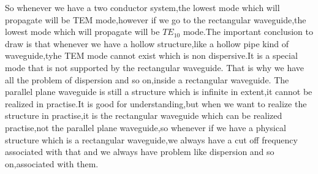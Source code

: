 So whenever we have a two conductor system,the lowest mode which will propagate will be TEM mode,however if we go to the rectangular waveguide,the lowest mode which will propagate will be ${TE_{10}}$ mode.The important conclusion to draw is that whenever we have a hollow structure,like a hollow pipe kind of waveguide,tyhe TEM mode cannot exist which is non dispersive.It is a special mode that is not supported by the rectangular waveguide. That is why we have all the problem of dispersion and so on,inside a rectangular waveguide. The parallel plane waveguide is still a structure which is infinite in extent,it cannot be realized in practise.It is good for understanding,but when we want to realize the structure in practise,it is the rectangular waveguide which can be realized practise,not the parallel plane waveguide,so whenever if we have a physical structure which is a rectangular waveguide,we always have a cut off frequency associated with that and we always have problem like dispersion and so on,associated with them.

